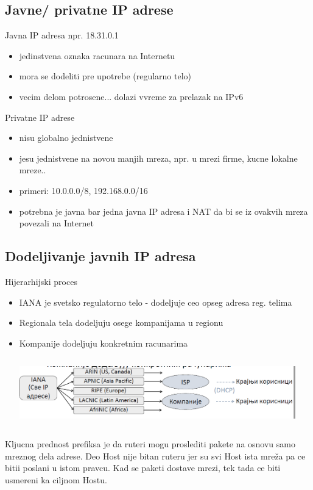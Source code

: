 \documentclass{article} %
\begin{document}
\subsection{Javne/ privatne IP adrese}
Javna IP adresa npr. 18.31.0.1
\begin{itemize}
  \item jedinstvena oznaka racunara na Internetu
\item mora se dodeliti pre upotrebe (regularno telo)
\item vecim delom potrosene... dolazi vvreme za prelazak na IPv6
\end{itemize}
Privatne IP adrese
\begin{itemize}
  \item nisu globalno jednistvene
\item jesu jednistvene na novou manjih mreza, npr. u mrezi firme, kucne lokalne mreze..
\item primeri: 10.0.0.0/8, 192.168.0.0/16
\item potrebna je javna bar jedna javna IP adresa i NAT da bi se iz ovakvih mreza povezali na Internet
\end{itemize}
\subsection{Dodeljivanje javnih IP adresa}
Hijerarhijski proces
\begin{itemize}
  \item IANA je svetsko regulatorno telo  - dodeljuje ceo opseg adresa reg. telima
\item Regionala tela dodeljuju osege kompanijama u regionu
\item Kompanije dodeljuju konkretnim racunarima
 \begin{center}
\includegraphics[width=12cm, height=3cm]{IANA}
\end{center}
\end{itemize}

Kljucna prednost prefiksa je da ruteri mogu proslediti pakete na osnovu samo
mreznog dela adrese. Deo Host nije bitan ruteru jer su svi Host ista mreža pa  ce bitii poslani u istom pravcu. Kad se paketi dostave mrezi, tek tada ce biti usmereni ka ciljnom Hostu.\\
\end{document}
